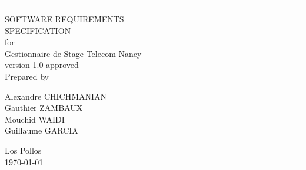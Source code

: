 \documentclass{scrreprt}
\date{}
\def\myversion{1.0 }
\begin{document}
\begin{flushright}
    \rule{15cm}{5pt}\vskip1cm
    \begin{bfseries}
        \Huge{SOFTWARE REQUIREMENTS\\ SPECIFICATION}\\
        \vspace{1.0cm}
        for\\
        \vspace{1.0cm}
        Gestionnaire de Stage Telecom Nancy\\
        \vspace{1.0cm}
        \LARGE{version \myversion approved}\\
        
        \vspace{1.0cm}
        Prepared by \\ 
        \vspace{1.0cm}
        \begin{flushleft}
        Alexandre CHICHMANIAN \\ Gauthier ZAMBAUX \\ Mouchid WAIDI \\ Guillaume GARCIA\\
        \end{flushleft}
        \vspace{1.0cm}
        Los Pollos\\
        \vspace{1.0cm}
        \today\\
    \end{bfseries}
\end{flushright}

\renewcommand{\contentsname}{Contenu}
\tableofcontents



\end{document}
